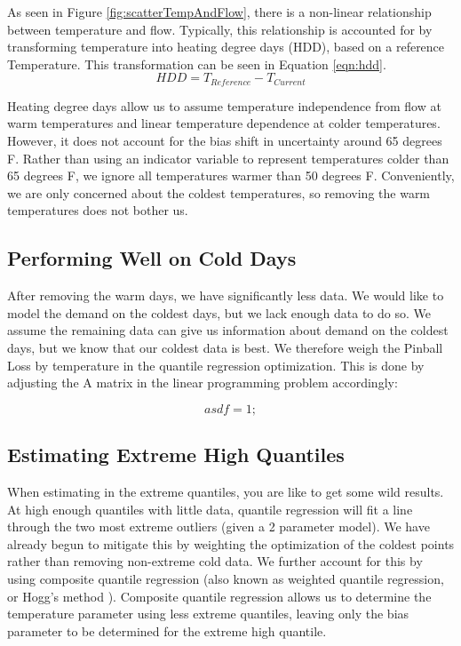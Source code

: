 \documentclass{article}
\begin{document}
As seen in Figure \ref{fig:scatterTempAndFlow}, there is a non-linear relationship between temperature and flow. Typically, this relationship is accounted for by transforming temperature into heating degree days (HDD), based on a reference Temperature. This transformation can be seen in Equation \ref{eqn:hdd}. 
\begin{equation}
    HDD= T_{Reference}-T_{Current}
    \label{eqn:hdd}
\end{equation}

Heating degree days allow us to assume temperature independence from flow at warm temperatures and linear temperature dependence at colder temperatures. However, it does not account for the bias shift in uncertainty around 65 degrees F. Rather than using an indicator variable to represent temperatures colder than 65 degrees F, we ignore all temperatures warmer than 50 degrees F. Conveniently, we are only concerned about the coldest temperatures, so removing the warm temperatures does not bother us.

\subsection{Performing Well on Cold Days}

After removing the warm days, we have significantly less data. We would like to model the demand on the coldest days, but we lack enough data to do so. We assume the remaining data can give us information about demand on the coldest days, but we know that our coldest data is best. We therefore weigh the Pinball Loss by temperature in the quantile regression optimization. This is done by adjusting the A matrix in the linear programming problem accordingly:

\begin{equation}
    asdf = 1;
\end{equation}

\subsection{Estimating Extreme High Quantiles}

When estimating in the extreme quantiles, you are like to get some wild results. At high enough quantiles with little data, quantile regression will fit a line through the two most extreme outliers (given a 2 parameter model). We have already begun to mitigate this by weighting the optimization of the coldest points rather than removing non-extreme cold data. We further account for this by using composite quantile regression (also known as weighted quantile regression, or Hogg's method \cite{}). Composite quantile regression allows us to determine the temperature parameter using less extreme quantiles, leaving only the bias parameter to be determined for the extreme high quantile.
\end{document}
